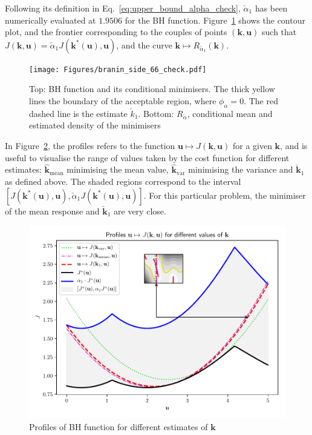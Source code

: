 \documentclass[npg, manuscript]{copernicus}
\newcommand{\kmean}{\hat{\mathbf{k}}_{\mathrm{mean}}}
\begin{document}
Following its definition in Eq.~\eqref{eq:upper_bound_alpha_check}, $\check{\alpha}_1$ has been numerically evaluated at $1.9506$ for the BH function. Figure~\ref{fig:contour_alpha} shows the contour plot, and the frontier corresponding to the couples of points $(\mathbf{k},\mathbf{u})$ such that $J(\mathbf{k},\mathbf{u}) = \check{\alpha}_1 J(\mathbf{k}^*(\mathbf{u}), \mathbf{u})$, and the curve $\mathbf{k}\mapsto R_{\check{\alpha}_1}(\mathbf{k})$.
\begin{figure}[t]
\texttt{[image: Figures/branin\_side\_66\_check.pdf]}
\caption{Top: BH function and its conditional minimisers. The thick yellow lines the boundary of the acceptable region, where $\phi_\alpha=0$. The red dashed line is the estimate $\check{k}_{1}$. Bottom: $R_{\check{\alpha}}$, conditional mean and estimated density of the minimisers}
\label{fig:contour_alpha}
\end{figure}
In Figure~\ref{fig:profiles_branin}, the profiles refers to the function $\mathbf{u}\mapsto J(\mathbf{k},\mathbf{u})$ for a given $\mathbf{k}$, and is useful to visualise the range of values taken by the cost function for different estimates: $\kmean$ minimising the mean value, $\hat{\mathbf{k}}_{\mathrm{var}}$ minimising the variance and $\check{\mathbf{k}}_1$ as defined above. The shaded regions correspond to the interval~$[J(\mathbf{k}^*(\mathbf{u}), \mathbf{u}), \check{\alpha}_1 J(\mathbf{k}^*(\mathbf{u}), \mathbf{u})]$. For this particular problem, the minimiser of the mean response and $\check{\mathbf{k}}_1$ are very close. 

\begin{figure}[t]
\includegraphics[width=12cm]{Figures/profile_branin.pdf}
\caption{Profiles of BH function for different estimates of $\mathbf{k}$}
\label{fig:profiles_branin}
\end{figure}
\end{document}
